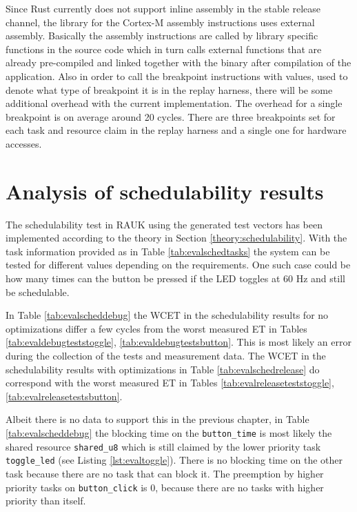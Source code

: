 Since Rust currently does not support inline assembly in the stable release
channel, the library for the Cortex-M assembly instructions uses external
assembly. Basically the assembly instructions are called by library specific
functions in the source code which in turn calls external functions that are
already pre-compiled and linked together with the binary after compilation of
the application. Also in order to call the breakpoint instructions with values,
used to denote what type of breakpoint it is in the replay harness, there will
be some additional overhead with the current implementation. The overhead for a
single breakpoint is on average around 20 cycles. There are three breakpoints
set for each task and resource claim in the replay harness and a single one for
hardware accesses.

\section{Analysis of schedulability results}
The schedulability test in RAUK using the generated test vectors has been
implemented according to the theory in Section \ref{theory:schedulability}.
With the task information provided as in Table \ref{tab:evalschedtasks} the
system can be tested for different values depending on the requirements. One
such case could be how many times can the button be pressed if the LED toggles
at 60 Hz and still be schedulable.

In Table \ref{tab:evalscheddebug} the WCET in the schedulability results for no
optimizations differ a few cycles from the worst measured ET in Tables
\ref{tab:evaldebugteststoggle}, \ref{tab:evaldebugtestsbutton}. This is most
likely an error during the collection of the tests and measurement data. The
WCET in the schedulability results with optimizations in Table
\ref{tab:evalschedrelease} do correspond with the worst measured ET in Tables
\ref{tab:evalreleaseteststoggle}, \ref{tab:evalreleasetestsbutton}.

Albeit there is no data to support this in the previous chapter, in Table
\ref{tab:evalscheddebug} the blocking time on the \texttt{button\_time} is most
likely the shared resource \texttt{shared\_u8} which is still claimed by the
lower priority task \texttt{toggle\_led} (see Listing \ref{lst:evaltoggle}).
There is no blocking time on the other task because there are no task that can
block it. The preemption by higher priority tasks on \texttt{button\_click} is
0, because there are no tasks with higher priority than itself.

